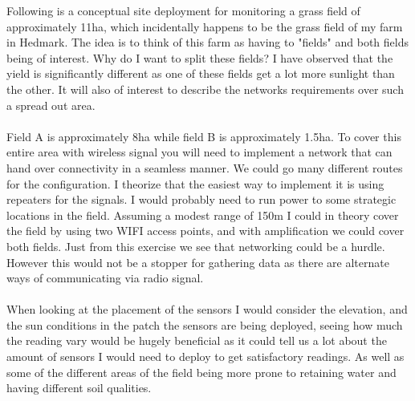 \documentclass[]{uiophd}
\begin{document}
 Following is a conceptual site deployment for monitoring a grass field of approximately 11ha, which incidentally happens to be the grass field of my farm in Hedmark. The idea is to think of this farm as having to "fields" and both fields being of interest. Why do I want to split these fields? I have observed that the yield is significantly different as one of these fields get a lot more sunlight than the other. It will also of interest to describe the networks requirements over such a spread out area.
 \\\\
 Field A is approximately 8ha while field B is approximately 1.5ha. To cover this entire area with wireless signal you will need to implement a network that can hand over connectivity in a seamless manner. We could go many different routes for the configuration. I theorize that the easiest way to implement it is using repeaters for the signals. I would probably need to run power to some strategic locations in the field. Assuming a modest range of 150m I could in theory cover the field by using two WIFI access points, and with amplification we could cover both fields. Just from this exercise we see that networking could be a hurdle. However this would not be a stopper for gathering data as there are alternate ways of communicating via radio signal.
 \\\\
 When looking at the placement of the sensors I would consider the elevation, and the sun conditions in the patch the sensors are being deployed, seeing how much the reading vary would be hugely beneficial as it could tell us a lot about the amount of sensors I would need to deploy to get satisfactory readings. As well as some of the different areas of the field being more prone to retaining water and having different soil qualities. 
 
\end{document}
